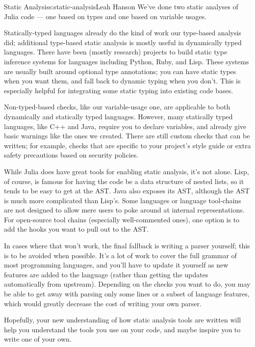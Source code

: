 \begin{aosachapter}{Static Analysis}{s:static-analysis}{Leah Hanson}
We've done two static analyses of Julia code --- one based on types and
one based on variable usages.

Statically-typed languages already do the kind of work our type-based
analysis did; additional type-based static analysis is mostly useful in
dynamically typed languages. There have been (mostly research) projects
to build static type inference systems for languages including Python,
Ruby, and Lisp. These systems are usually built around optional type
annotations; you can have static types when you want them, and fall back
to dynamic typing when you don't. This is especially helpful for
integrating some static typing into existing code bases.

Non-typed-based checks, like our variable-usage one, are applicable to
both dynamically and statically typed languages. However, many
statically typed languages, like C++ and Java, require you to declare
variables, and already give basic warnings like the ones we created.
There are still custom checks that can be written; for example, checks
that are specific to your project's style guide or extra safety
precautions based on security policies.

While Julia does have great tools for enabling static analysis, it's not
alone. Lisp, of course, is famous for having the code be a data
structure of nested lists, so it tends to be easy to get at the AST.
Java also exposes its AST, although the AST is much more complicated
than Lisp's. Some languages or language tool-chains are not designed to
allow mere users to poke around at internal representations. For
open-source tool chains (especially well-commented ones), one option is
to add the hooks you want to pull out to the AST.

In cases where that won't work, the final fallback is writing a parser
yourself; this is to be avoided when possible. It's a lot of work to
cover the full grammar of most programming languages, and you'll have to
update it yourself as new features are added to the language (rather
than getting the updates automatically from upstream). Depending on the
checks you want to do, you may be able to get away with parsing only
some lines or a subset of language features, which would greatly
decrease the cost of writing your own parser.

Hopefully, your new understanding of how static analysis tools are
written will help you understand the tools you use on your code, and
maybe inspire you to write one of your own.

\end{aosachapter}
